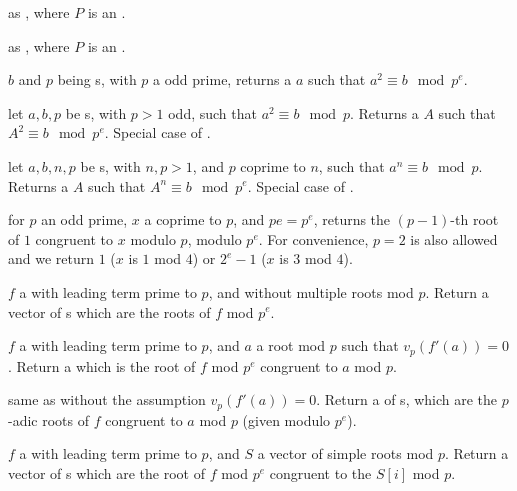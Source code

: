  as
, where $P$ is an .

 as
, where $P$ is an .


 $b$ and $p$ being s, with $p$
a odd prime, returns a  $a$ such that $a^2 \equiv b \mod p^e$.

 let
$a,b,p$ be s, with $p > 1$ odd, such that $a^2\equiv b\mod p$.
Returns a  $A$ such that $A^2 \equiv b \mod p^e$. Special case
of .

 let
$a,b,n,p$ be s, with $n,p > 1$, and $p$ coprime to $n$,
such that $a^n \equiv b \mod p$. Returns a  $A$ such that
$A^n \equiv b \mod p^e$. Special case of .

 for $p$ an odd prime,
$x$ a  coprime to $p$, and $pe = p^e$, returns the $(p-1)$-th root of
$1$ congruent to $x$ modulo $p$, modulo $p^e$. For convenience, $p = 2$ is
also allowed and we return $1$ ($x$ is $1$ mod $4$) or $2^e - 1$ ($x$ is $3$
mod $4$).


 $f$ a  with leading
term prime to $p$, and without multiple roots mod $p$. Return a vector
of s which are the roots of $f$ mod $p^e$.

 $f$ a  with
leading term prime to $p$, and $a$ a root mod $p$ such that
$v_p(f'(a))=0$.  Return a  which is the root of $f$ mod $p^e$
congruent to $a$ mod $p$.

 same as 
without the assumption $v_p(f'(a)) = 0$. Return a  of s,
which are the $p$-adic roots of $f$ congruent to $a$ mod $p$ (given modulo
$p^e$).

 $f$ a  with
leading term prime to $p$, and $S$ a vector of simple roots mod $p$. Return a
vector of s which are the root of $f$ mod $p^e$ congruent to the
$S[i]$ mod $p$.

